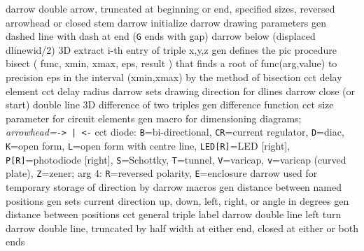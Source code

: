   {darrow}
  {double arrow, truncated at beginning or end, specified sizes,
    reversed arrowhead or closed stem}
  {darrow}
  {initialize darrow drawing parameters}
  {gen}
  {dashed line with dash at end ({\tt G} ends with gap)}
  {darrow}
  {below (displaced dlinewid/2)}
  {3D}
  {extract i-th entry of triple x,y,z}
  {gen}
  {defines the pic procedure bisect ( func, xmin, xmax, eps, result )
   that finds a root of func(arg,value) to precision eps in the interval
   (xmin,xmax) by the method of bisection}
  {cct}
  {delay element}
  {cct}
  {delay radius}
  {darrow}
  {sets drawing direction for dlines}
  {darrow}
  {close (or start) double line}
  {3D}
  {difference of two triples}
  {gen}
  {difference function}
  {cct}
  {size parameter for circuit elements}
  {gen}
  {macro for dimensioning diagrams;
      {\sl arrowhead=}{\tt -> | <-}}
  {cct}
  {diode: 
   {\tt B}=bi-directional,
   {\tt CR}=current regulator,
   {\tt D}=diac,
   {\tt K}=open form,
   {\tt L}=open form with centre line,
   {\tt LED[R]}=LED [right],
   {\tt P[R]}=photodiode [right],
   {\tt S}=Schottky,
   {\tt T}=tunnel,
   {\tt V}=varicap,
   {\tt v}=varicap (curved plate),
   {\tt Z}=zener;
   arg 4: {\tt R}=reversed polarity, {\tt E}=enclosure }
  {darrow}
  {used for temporary storage of direction by darrow macros}
  {gen}
  {distance between named positions}
  {gen}
  {sets current direction up, down, left, right, or angle in degrees}
  {gen}
  {distance between positions}
  {cct}
  {general triple label}
  {darrow}
  {double line left turn}
  {darrow}
  {double line, truncated by half width at either end, closed
    at either or both ends}
